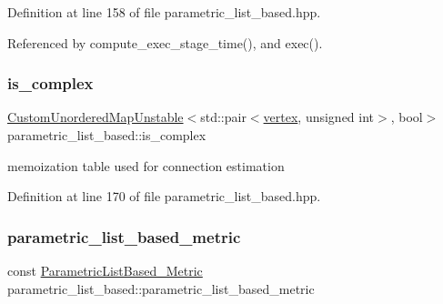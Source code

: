 Definition at line 158 of file parametric\+\_\+list\+\_\+based.\+hpp.



Referenced by compute\+\_\+exec\+\_\+stage\+\_\+time(), and exec().

\mbox{\label{classparametric__list__based_afe0501bc0000245623bd0064a37f1a60}} 
\subsubsection{\texorpdfstring{is\+\_\+complex}{is\_complex}}
{\footnotesize\ttfamily \hyperlink{custom__map_8hpp_a8cbaceffc09790a885ec7e9c17809c69}{Custom\+Unordered\+Map\+Unstable}$<$std\+::pair$<$\hyperlink{graph_8hpp_abefdcf0544e601805af44eca032cca14}{vertex}, unsigned int$>$, bool$>$ parametric\+\_\+list\+\_\+based\+::is\+\_\+complex\hspace{0.3cm}{\ttfamily [private]}}



memoization table used for connection estimation 



Definition at line 170 of file parametric\+\_\+list\+\_\+based.\+hpp.

\mbox{\label{classparametric__list__based_a9c6cc1104ca3c70cee7e55305bae7933}} 
\subsubsection{\texorpdfstring{parametric\+\_\+list\+\_\+based\+\_\+metric}{parametric\_list\_based\_metric}}
{\footnotesize\ttfamily const \hyperlink{parametric__list__based_8hpp_af0e38be9a93de210a888144f6a52e498}{Parametric\+List\+Based\+\_\+\+Metric} parametric\+\_\+list\+\_\+based\+::parametric\+\_\+list\+\_\+based\+\_\+metric\hspace{0.3cm}{\ttfamily [private]}}



